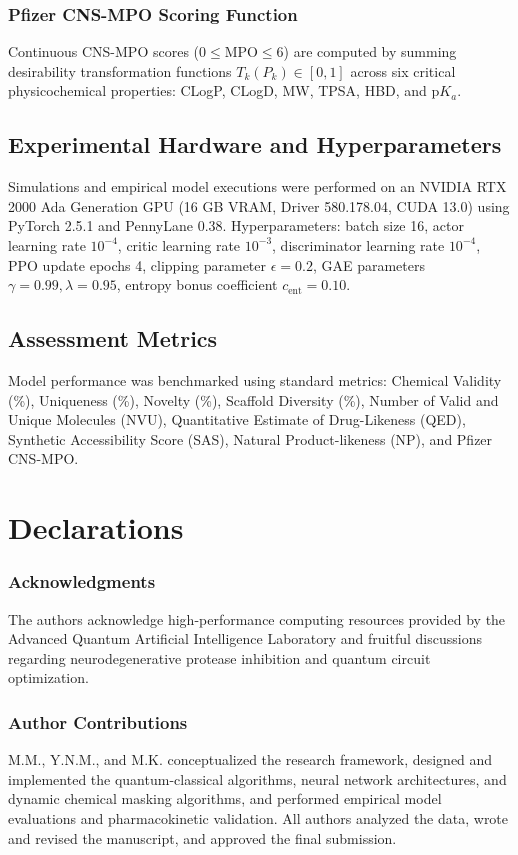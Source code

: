 \documentclass[10pt,a4paper]{article}
\begin{document}
\subsubsection*{Pfizer CNS-MPO Scoring Function}
Continuous CNS-MPO scores ($0 \le \text{MPO} \le 6$) are computed by summing desirability transformation functions $T_k(P_k) \in [0, 1]$ across six critical physicochemical properties: CLogP, CLogD, MW, TPSA, HBD, and $\text{p}K_a$.

\subsection{Experimental Hardware and Hyperparameters}
Simulations and empirical model executions were performed on an NVIDIA RTX 2000 Ada Generation GPU (16 GB VRAM, Driver 580.178.04, CUDA 13.0) using PyTorch 2.5.1 and PennyLane 0.38. Hyperparameters: batch size 16, actor learning rate $10^{-4}$, critic learning rate $10^{-3}$, discriminator learning rate $10^{-4}$, PPO update epochs 4, clipping parameter $\epsilon = 0.2$, GAE parameters $\gamma = 0.99, \lambda = 0.95$, entropy bonus coefficient $c_{\text{ent}} = 0.10$.

\subsection{Assessment Metrics}
Model performance was benchmarked using standard metrics: Chemical Validity (\%), Uniqueness (\%), Novelty (\%), Scaffold Diversity (\%), Number of Valid and Unique Molecules (NVU), Quantitative Estimate of Drug-Likeness (QED), Synthetic Accessibility Score (SAS), Natural Product-likeness (NP), and Pfizer CNS-MPO.

\section*{Declarations}

\subsubsection*{Acknowledgments}
The authors acknowledge high-performance computing resources provided by the Advanced Quantum Artificial Intelligence Laboratory and fruitful discussions regarding neurodegenerative protease inhibition and quantum circuit optimization.

\subsubsection*{Author Contributions}
M.M., Y.N.M., and M.K. conceptualized the research framework, designed and implemented the quantum-classical algorithms, neural network architectures, and dynamic chemical masking algorithms, and performed empirical model evaluations and pharmacokinetic validation. All authors analyzed the data, wrote and revised the manuscript, and approved the final submission.
\end{document}
